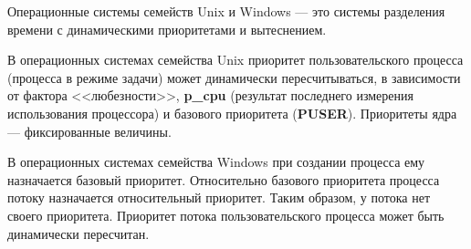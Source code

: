\documentclass{bmstu}
\begin{document}
Операционные системы семейств Unix и Windows --- это системы разделения времени с динамическими приоритетами и вытеснением.

В операционных системах семейства Unix приоритет пользовательского процесса (процесса в режиме задачи) может динамически пересчитываться, в зависимости от фактора <<любезности>>, \textbf{p\_cpu} (результат последнего измерения использования процессора) и базового приоритета (\textbf{PUSER}). 
Приоритеты ядра --- фиксированные величины.

В операционных системах семейства Windows при создании процесса ему назначается базовый приоритет. 
Относительно базового приоритета процесса потоку назначается относительный приоритет. 
Таким образом, у потока нет своего приоритета. 
Приоритет потока пользовательского процесса может быть динамически пересчитан.
\end{document}
